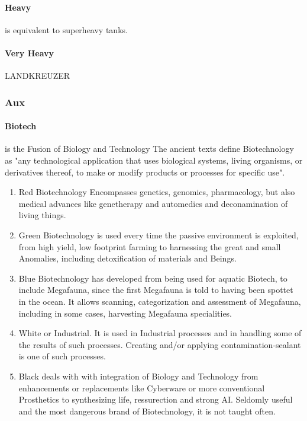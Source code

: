 \documentclass{article}
\begin{document}
        \paragraph{Heavy} is equivalent to superheavy tanks.
        \paragraph{Very Heavy} LANDKREUZER

    \subsubsection{Aux}
        \paragraph{Biotech} is the Fusion of Biology and Technology \newline The ancient texts define Biotechnology as
        "any technological application that uses biological systems, living organisms, or derivatives thereof, to make
        or modify products or processes for specific use".
        \begin{enumerate}[label= -]
            \item{Red} Biotechnology Encompasses genetics, genomics, pharmacology, but also medical advances like
            genetherapy and automedics and deconamination of living things.
            \item{Green} Biotechnology is used every time the passive environment is exploited, from high yield,
            low footprint farming to harnessing the great and small Anomalies, including detoxification of materials and
            Beings.
            \item{Blue} Biotechnology has developed from being used for aquatic Biotech, to include Megafauna, since the
            first Megafauna is told to having been spottet in the ocean. It allows scanning, categorization and
            assessment of Megafauna, including in some cases, harvesting Megafauna specialities.
            \item{White} or Industrial. It is used in Industrial processes and in handling some of the results of such
            processes. Creating and/or applying contamination-sealant is one of such processes.
            \item{Black} deals with with integration of Biology and Technology from enhancements or replacements like
            Cyberware or more conventional Prosthetics to synthesizing life, ressurection and strong AI. Seldomly useful
            and the most dangerous brand of Biotechnology, it is not taught often.
        \end{enumerate}
    \pagebreak
\end{document}
